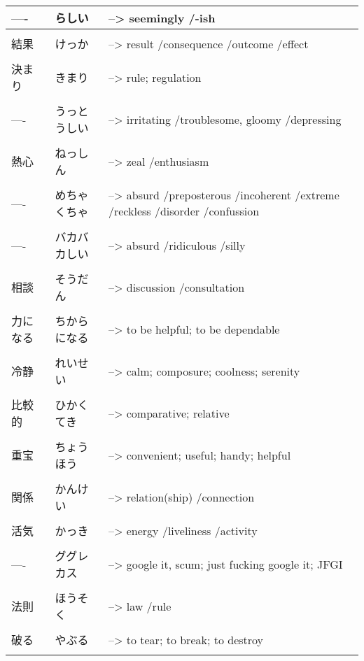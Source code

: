 \documentclass{article}
\begin{document}
\begin{tabular}{ l | l p{14cm}  }
---- & らしい &--> seemingly /-ish \\ \hline\\[-1em]
結果 & けっか &--> result /consequence /outcome /effect \\ \hline\\[-1em]
決まり & きまり &--> rule; regulation \\ \hline\\[-1em]
---- & うっとうしい &--> irritating /troublesome, gloomy /depressing \\ \hline\\[-1em]
熱心 & ねっしん &--> zeal /enthusiasm \\ \hline\\[-1em]
---- & めちゃくちゃ &--> absurd /preposterous /incoherent /extreme /reckless /disorder /confussion \\ \hline\\[-1em]
---- & バカバカしい &--> absurd /ridiculous /silly \\ \hline\\[-1em]
相談 & そうだん &--> discussion /consultation \\ \hline\\[-1em]
力になる & ちからになる &--> to be helpful; to be dependable \\ \hline\\[-1em]
冷静 & れいせい &--> calm; composure; coolness; serenity \\ \hline\\[-1em]
比較的 & ひかくてき &--> comparative; relative \\ \hline\\[-1em]
重宝 & ちょうほう &--> convenient; useful; handy; helpful \\ \hline\\[-1em]
関係 & かんけい &--> relation(ship) /connection \\ \hline\\[-1em]
活気 & かっき &--> energy /liveliness /activity \\ \hline\\[-1em]
---- & ググレカス &--> google it, scum; just fucking google it; JFGI \\ \hline\\[-1em]
法則 & ほうそく &--> law /rule \\ \hline\\[-1em]
破る & やぶる &--> to tear; to break; to destroy \\ \hline\\[-1em]

\end{tabular}
\end{document}
